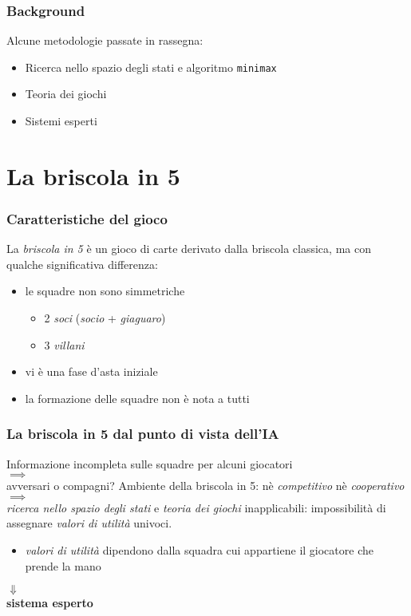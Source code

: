 \documentclass{beamer}
\newcommand*\lista{\item[$\diamondsuit$]}
\newcommand*\slista{\item[$\spadesuit$]}
\begin{document}
\begin{frame}
   \frametitle{Background}
   Alcune metodologie passate in rassegna:\\
   \begin{itemize}
      \lista Ricerca nello spazio degli stati e algoritmo \texttt{minimax} 
      \lista Teoria dei giochi
      \lista Sistemi esperti
   \end{itemize}
   
\end{frame}
\section{La briscola in 5}

\begin{frame}
   \frametitle{Caratteristiche del gioco}
   
   La \emph{briscola in 5} è un gioco di carte derivato dalla briscola classica, ma con qualche significativa differenza:\\
   \begin{itemize}
      \pause
      \lista le squadre non sono simmetriche
      \begin{itemize}
         \slista 2 \emph{soci} (\emph{socio} + \emph{giaguaro})
         \slista 3 \emph{villani}
      \end{itemize}
      \pause
      \lista vi è una fase d'asta iniziale
      \pause
      \lista la formazione delle squadre non è nota a tutti
   \end{itemize}
\end{frame}


\begin{frame}
   \frametitle{La briscola in 5 dal punto di vista dell'IA}
   \centering
   Informazione incompleta sulle squadre per alcuni giocatori \\
   $\implies$\\
   avversari o compagni?
   \vfill
   \pause
   Ambiente della briscola in 5: nè \emph{competitivo} nè \emph{cooperativo} \\
   $\implies$\\
   \emph{ricerca nello spazio degli stati} e  \emph{teoria dei giochi} inapplicabili: impossibilità di assegnare \emph{valori di utilità} univoci.
   \centering
   \vspace{.7em}
      \begin{itemize}
      \item \emph{valori di utilità} dipendono dalla squadra cui appartiene il giocatore che prende la mano
   \end{itemize}
   \vfill
   \pause
   \Large   
   $\Downarrow$\\
   \vfill
   \normalsize
   \textbf{sistema esperto}
   
\end{frame}
\end{document}
